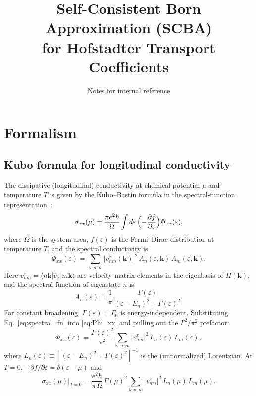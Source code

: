 \documentclass[11pt]{article}
\title{Self-Consistent Born Approximation (SCBA) \\
for Hofstadter Transport Coefficients}
\author{Notes for internal reference}
\date{}
\newcommand{\Gam}{\Gamma}
\newcommand{\eps}{\varepsilon}
\begin{document}
\maketitle

\section{Formalism}

\subsection{Kubo formula for longitudinal conductivity}

The dissipative (longitudinal) conductivity at chemical potential $\mu$
and temperature $T$ is given by the Kubo--Bastin formula in the
spectral-function representation~\cite{Bastin1971,Streda1982}:
\begin{equation}\label{eq:sxx_spectral}
  \sigma_{xx}(\mu) = \frac{\pi e^2 \hbar}{\Omega}
  \int d\eps\, \Bigl(-\frac{\partial f}{\partial\eps}\Bigr)
  \Phi_{xx}(\eps),
\end{equation}
where $\Omega$ is the system area, $f(\eps)$ is the Fermi--Dirac
distribution at temperature $T$, and the spectral conductivity is
\begin{equation}\label{eq:Phi_xx}
  \Phi_{xx}(\eps) = \sum_{\mathbf{k},n,m}
  |v^x_{nm}(\mathbf{k})|^2\, A_n(\eps,\mathbf{k})\, A_m(\eps,\mathbf{k}).
\end{equation}
Here $v^x_{nm} = \langle n\mathbf{k}|\hat{v}_x|m\mathbf{k}\rangle$
are velocity matrix elements in the eigenbasis of $H(\mathbf{k})$,
and the spectral function of eigenstate $n$ is
\begin{equation}\label{eq:spectral_fn}
  A_n(\eps) = \frac{1}{\pi}\,
  \frac{\Gam(\eps)}{(\eps - E_n)^2 + \Gam(\eps)^2}.
\end{equation}
For constant broadening, $\Gam(\eps) = \Gam_0$ is
energy-independent.  Substituting Eq.~\eqref{eq:spectral_fn} into
\eqref{eq:Phi_xx} and pulling out the $\Gam^2/\pi^2$ prefactor:
\begin{equation}\label{eq:Phi_xx_L}
  \Phi_{xx}(\eps) = \frac{\Gam(\eps)^2}{\pi^2}
  \sum_{\mathbf{k},n,m} |v^x_{nm}|^2\, L_n(\eps)\, L_m(\eps),
\end{equation}
where $L_n(\eps) \equiv [(\eps - E_n)^2 + \Gam(\eps)^2]^{-1}$ is the
(unnormalized) Lorentzian.  At $T=0$,
$-\partial f/\partial\eps = \delta(\eps - \mu)$ and
\begin{equation}
  \sigma_{xx}(\mu)\Big|_{T=0}
  = \frac{e^2 \hbar}{\pi\,\Omega}\, \Gam(\mu)^2
  \sum_{\mathbf{k},n,m} |v^x_{nm}|^2\, L_n(\mu)\, L_m(\mu).
\end{equation}
\end{document}
